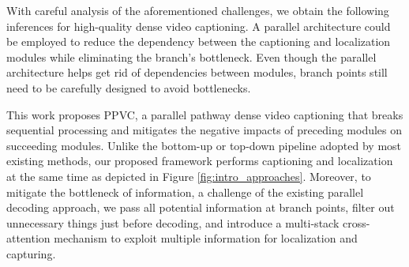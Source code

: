 With careful analysis of the aforementioned challenges, we obtain the following inferences for high-quality dense video captioning. 
A parallel architecture could be employed to reduce the dependency between the captioning and localization modules while eliminating the branch's bottleneck. 
Even though the parallel architecture helps get rid of dependencies between modules, branch points still need to be carefully designed to avoid bottlenecks.

This work proposes PPVC, a parallel pathway dense video captioning that breaks sequential processing and mitigates the negative impacts of preceding modules on succeeding modules.
Unlike the bottom-up or top-down pipeline adopted by most existing methods, our proposed framework performs captioning and localization at the same time as depicted in Figure \ref{fig:intro_approaches}.
Moreover, to mitigate the bottleneck of information, a challenge of the existing parallel decoding approach, we pass all potential information at branch points, filter out unnecessary things just before decoding, and introduce a multi-stack cross-attention mechanism to exploit multiple information for localization and capturing.



